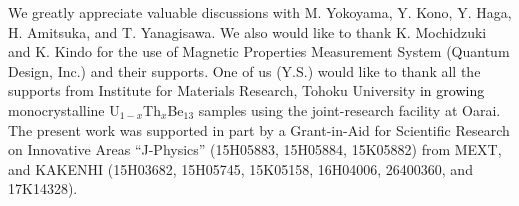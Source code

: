 \documentclass[twocolumn, prl]{revtex4}%
\newcommand{\correct}[1]{\textcolor{black}{#1}}
\begin{document}
\begin{acknowledgments}
We greatly appreciate valuable discussions with  M. Yokoyama, Y. Kono, Y. Haga, H. Amitsuka,  and T. Yanagisawa.
We  also would like to thank K. Mochidzuki and K. Kindo for 
  the use of Magnetic Properties Measurement System (Quantum Design, Inc.) and their supports.
One of us (Y.S.) would like to thank 
 all the  supports from  Institute for Materials Research, Tohoku University  
 \correct{in growing} monocrystalline  U$_{1-x}$Th$_{x}$Be$_{13}$ samples using the joint-research facility at Oarai.
The present work was supported in part by a Grant-in-Aid for Scientific Research on Innovative Areas ``J-Physics'' (15H05883, 15H05884, 15K05882)
 from MEXT, and KAKENHI (15H03682, 15H05745, 15K05158, 16H04006,  26400360, and 17K14328).
\end{acknowledgments}
\end{document}
